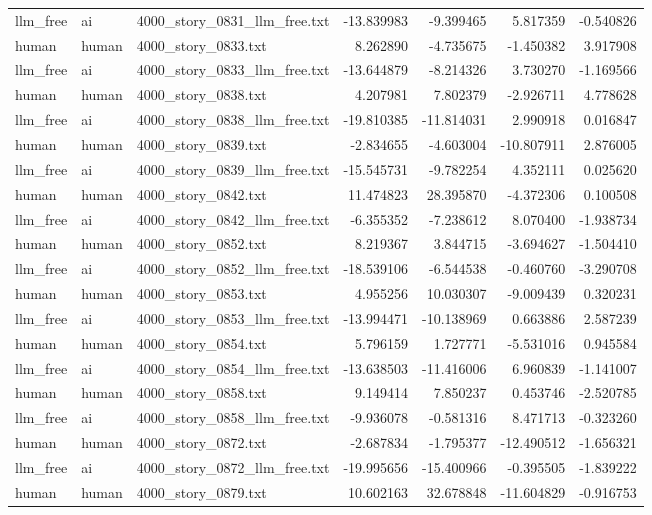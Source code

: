 \begin{longtable}{lllrrrr}
llm\_free & ai & 4000\_story\_0831\_llm\_free.txt & -13.839983 & -9.399465 & 5.817359 & -0.540826 \\
human & human & 4000\_story\_0833.txt & 8.262890 & -4.735675 & -1.450382 & 3.917908 \\
llm\_free & ai & 4000\_story\_0833\_llm\_free.txt & -13.644879 & -8.214326 & 3.730270 & -1.169566 \\
human & human & 4000\_story\_0838.txt & 4.207981 & 7.802379 & -2.926711 & 4.778628 \\
llm\_free & ai & 4000\_story\_0838\_llm\_free.txt & -19.810385 & -11.814031 & 2.990918 & 0.016847 \\
human & human & 4000\_story\_0839.txt & -2.834655 & -4.603004 & -10.807911 & 2.876005 \\
llm\_free & ai & 4000\_story\_0839\_llm\_free.txt & -15.545731 & -9.782254 & 4.352111 & 0.025620 \\
human & human & 4000\_story\_0842.txt & 11.474823 & 28.395870 & -4.372306 & 0.100508 \\
llm\_free & ai & 4000\_story\_0842\_llm\_free.txt & -6.355352 & -7.238612 & 8.070400 & -1.938734 \\
human & human & 4000\_story\_0852.txt & 8.219367 & 3.844715 & -3.694627 & -1.504410 \\
llm\_free & ai & 4000\_story\_0852\_llm\_free.txt & -18.539106 & -6.544538 & -0.460760 & -3.290708 \\
human & human & 4000\_story\_0853.txt & 4.955256 & 10.030307 & -9.009439 & 0.320231 \\
llm\_free & ai & 4000\_story\_0853\_llm\_free.txt & -13.994471 & -10.138969 & 0.663886 & 2.587239 \\
human & human & 4000\_story\_0854.txt & 5.796159 & 1.727771 & -5.531016 & 0.945584 \\
llm\_free & ai & 4000\_story\_0854\_llm\_free.txt & -13.638503 & -11.416006 & 6.960839 & -1.141007 \\
human & human & 4000\_story\_0858.txt & 9.149414 & 7.850237 & 0.453746 & -2.520785 \\
llm\_free & ai & 4000\_story\_0858\_llm\_free.txt & -9.936078 & -0.581316 & 8.471713 & -0.323260 \\
human & human & 4000\_story\_0872.txt & -2.687834 & -1.795377 & -12.490512 & -1.656321 \\
llm\_free & ai & 4000\_story\_0872\_llm\_free.txt & -19.995656 & -15.400966 & -0.395505 & -1.839222 \\
human & human & 4000\_story\_0879.txt & 10.602163 & 32.678848 & -11.604829 & -0.916753 \\

\end{longtable}
